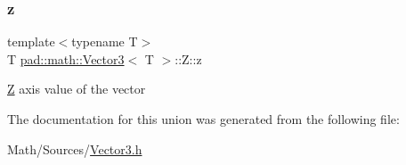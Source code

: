 \mbox{\label{unionpad_1_1math_1_1_vector3_1_1_z_afb1c26400fed73d3c1b82620f4a06df1}} 
\subsubsection{\texorpdfstring{z}{z}}
{\footnotesize\ttfamily template$<$typename T$>$ \\
T \mbox{\hyperlink{structpad_1_1math_1_1_vector3}{pad\+::math\+::\+Vector3}}$<$ T $>$\+::Z\+::z}

\mbox{\hyperlink{unionpad_1_1math_1_1_vector3_1_1_z}{Z}} axis value of the vector 

The documentation for this union was generated from the following file\+:\begin{DoxyCompactItemize}
\item 
Math/\+Sources/\mbox{\hyperlink{_vector3_8h}{Vector3.\+h}}\end{DoxyCompactItemize}
